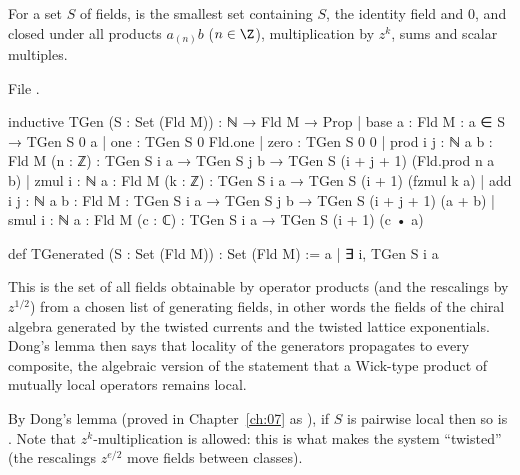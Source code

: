 \begin{definition}\label{ch08:def:TGen}
For a set $S$ of fields,  is the smallest set containing $S$, the identity
field and $0$, and closed under all products $a_{(n)}b$ ($n\in\Z$), multiplication by $z^k$,
sums and scalar multiples.
\end{definition}
\noindent File .
\begin{leancode}
inductive TGen (S : Set (Fld M)) : ℕ → Fld M → Prop
  | base {a : Fld M} : a ∈ S → TGen S 0 a
  | one : TGen S 0 Fld.one
  | zero : TGen S 0 0
  | prod {i j : ℕ} {a b : Fld M} (n : ℤ) : TGen S i a → TGen S j b →
      TGen S (i + j + 1) (Fld.prod n a b)
  | zmul {i : ℕ} {a : Fld M} (k : ℤ) : TGen S i a → TGen S (i + 1) (fzmul k a)
  | add {i j : ℕ} {a b : Fld M} : TGen S i a → TGen S j b → TGen S (i + j + 1) (a + b)
  | smul {i : ℕ} {a : Fld M} (c : ℂ) : TGen S i a → TGen S (i + 1) (c • a)

def TGenerated (S : Set (Fld M)) : Set (Fld M) := {a | ∃ i, TGen S i a}
\end{leancode}

\begin{physics}
This is the set of all fields obtainable by operator products (and the rescalings by $z^{1/2}$) from a chosen list of generating fields, in other words the fields of the chiral algebra generated by the twisted currents and the twisted lattice exponentials. Dong's lemma then says that locality of the generators propagates to every composite, the algebraic version of the statement that a Wick-type product of mutually local operators remains local.
\end{physics}
By Dong's lemma (proved in Chapter~\ref{ch:07} as ), if $S$ is pairwise
local then so is .  Note that $z^k$-multiplication is allowed: this is what
makes the system ``twisted'' (the rescalings $z^{e/2}$ move fields between classes).


